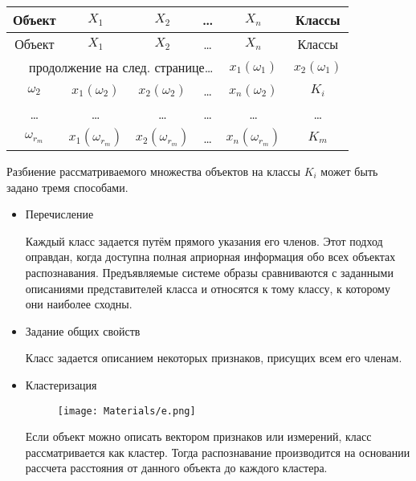                 \begin{longtable}{|c|c|c|c|c|c|}
        		\hline
        		\textbf{Объект} & \textbf{$X_1$} & \textbf{$X_2$} & \textbf{\dots} & \textbf{$X_n$} & \textbf{Классы} \\ \hline
        		\endfirsthead
        		\hline
        		Объект & $X_1$ & $X_2$ & \dots & $X_n$ & Классы \\ \hline
        		\endhead
        		\hline
        		\multicolumn{4}{r}{продолжение на след. странице\ldots} \
        		\endfoot
        		\hline
        		\endlastfoot
        		    $\omega_1$ & $x_1(\omega_1)$ & $x_2(\omega_1)$ & \dots & $x_n(\omega_1)$ & $K_1$ \\
        		    $\omega_2$ & $x_1(\omega_2)$ & $x_2(\omega_2)$ & \dots & $x_n(\omega_2)$ & $K_i$ \\
        		    \dots & \dots & \dots & \dots & \dots & \dots\\
        		    $\omega_{r_m}$ & $x_1(\omega_{r_m})$ & $x_2(\omega_{r_m})$ & \dots & $x_n(\omega_{r_m})$ & $K_m$
        		\end{longtable}
        		
    	        Разбиение рассматриваемого множества объектов на классы
    	        $K_i$ может быть задано тремя способами. 
    	        \begin{itemize}
    		        \item Перечисление
    		            
    		            Каждый класс задается путём прямого указания его членов. Этот подход оправдан, когда доступна полная априорная информация обо всех объектах распознавания. Предъявляемые системе образы сравниваются с заданными описаниями представителей класса и относятся к тому классу, к которому они наиболее сходны.
    			    \item Задание общих свойств
    			    
    			        Класс задается описанием некоторых признаков, присущих всем его членам. 
    			    \item Кластеризация
    			        \begin{figure}[h!]
                            \centering \texttt{[image: Materials/e.png]}
                        \end{figure}
                        
    			        Если объект можно описать вектором признаков 
    			        или измерений, класс рассматривается как кластер. Тогда распознавание производится на основании рассчета расстояния от данного объекта до каждого кластера. 
    			        
    		    \end{itemize}
        		
